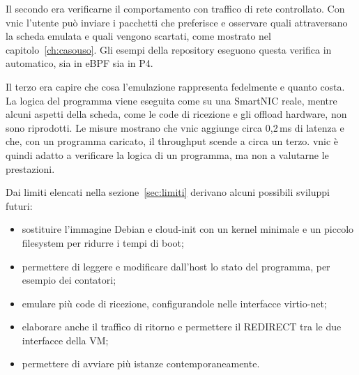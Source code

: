 Il secondo era verificarne il comportamento con traffico di rete controllato. Con vnic l'utente può inviare i pacchetti che preferisce e osservare quali attraversano la scheda emulata e quali vengono scartati, come mostrato nel capitolo~\ref{ch:casouso}. Gli esempi della repository eseguono questa verifica in automatico, sia in eBPF sia in P4.

Il terzo era capire che cosa l'emulazione rappresenta fedelmente e quanto costa. La logica del programma viene eseguita come su una SmartNIC reale, mentre alcuni aspetti della scheda, come le code di ricezione e gli offload hardware, non sono riprodotti. Le misure mostrano che vnic aggiunge circa 0,2\,ms di latenza e che, con un programma caricato, il throughput scende a circa un terzo. vnic è quindi adatto a verificare la logica di un programma, ma non a valutarne le prestazioni.

Dai limiti elencati nella sezione~\ref{sec:limiti} derivano alcuni possibili sviluppi futuri:
\begin{itemize}
    \item sostituire l'immagine Debian e cloud-init con un kernel minimale e un piccolo filesystem per ridurre i tempi di boot;
    \item permettere di leggere e modificare dall'host lo stato del programma, per esempio dei contatori;
    \item emulare più code di ricezione, configurandole nelle interfacce virtio-net;
    \item elaborare anche il traffico di ritorno e permettere il REDIRECT tra le due interfacce della VM;
    \item permettere di avviare più istanze contemporaneamente.
\end{itemize}